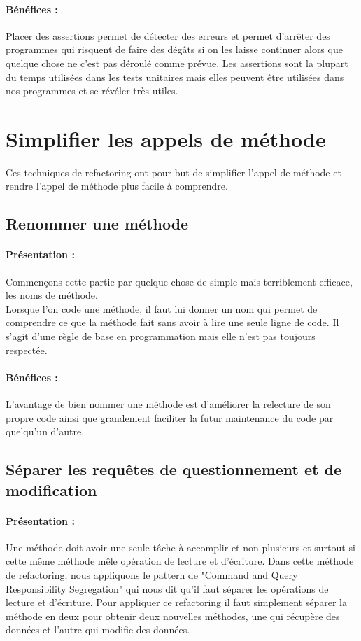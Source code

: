 \documentclass[a4paper,twoside,12pt,openright]{report}
\begin{document}
\paragraph{Bénéfices :}
Placer des assertions permet de détecter des erreurs et permet d'arrêter des programmes qui risquent de faire des dégâts si on les laisse continuer alors que quelque chose ne c'est pas déroulé comme prévue.
Les assertions sont la plupart du temps utilisées dans les tests unitaires mais elles peuvent être utilisées dans nos programmes et se révéler très utiles.\\

\newpage
\section{Simplifier les appels de méthode}
Ces techniques de refactoring ont pour but de simplifier l'appel de méthode et rendre l'appel de méthode plus facile à comprendre.\\



\subsection{Renommer une méthode}
\paragraph{Présentation :}
Commençons cette partie par quelque chose de simple mais terriblement efficace, les noms de méthode.\\
Lorsque l'on code une méthode, il faut lui donner un nom qui permet de comprendre ce que la méthode fait sans avoir à lire une seule ligne de code. Il s'agit d'une règle de base en programmation mais elle n'est pas toujours respectée.

\paragraph{Bénéfices :}
L'avantage de bien nommer une méthode est d'améliorer la relecture de son propre code ainsi que grandement faciliter la futur maintenance du code par quelqu'un d'autre.\\

\subsection{Séparer les requêtes de questionnement et de modification}
\paragraph{Présentation :}
Une méthode doit avoir une seule tâche à accomplir et non plusieurs et surtout si cette même méthode mêle opération de lecture et d'écriture.
Dans cette méthode de refactoring, nous appliquons le pattern de "Command and Query Responsibility Segregation" qui nous dit qu'il faut séparer les opérations de lecture et d'écriture.
Pour appliquer ce refactoring il faut simplement séparer la méthode en deux pour obtenir deux nouvelles méthodes, une qui récupère des données et l'autre qui modifie des données.
\end{document}
